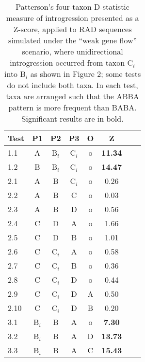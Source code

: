 \documentclass[12pt,letterpaper]{article}
\begin{document}
\begin{table}
  \caption{Patterson's four-taxon D-statistic measure of introgression presented as a Z-score, applied to RAD sequences simulated under the ``weak gene flow'' scenario, where unidirectional introgression occurred from taxon C$_i$ into B$_i$ as shown in Figure 2; some tests do not include both taxa. In each test, taxa are arranged such that the ABBA pattern is more frequent than BABA. Significant results are in bold.}
\label{tab:2}
\begin{center}
\begin{tabular*}{0.5\textwidth}{@{\extracolsep{\fill}}lccccccc}
\hline
Test         & P1    & P2       & P3      & O       &Z    \\
\hline
\hline
1.1          & A    & B$_i$    & C$_i$    & o       &\bf11.34  \\
1.2          & B    & B$_i$    & C$_i$    & o       &\bf14.47  \\
2.1          & A    & B        & C$_i$    & o       &0.26  \\
2.2          & A    & B        & C        & o       &0.03  \\
2.3          & A    & B        & D        & o       &0.56  \\
2.4          & C    & D        & A        & o       &1.66  \\
2.5          & C    & D        & B        & o       &1.01  \\
2.6          & C    & C$_i$    & A        & o       &0.58  \\
2.7          & C    & C$_i$    & B        & o       &0.36  \\
2.8          & C    & C$_i$    & D        & o       &0.44  \\
2.9          & C    & C$_i$    & D        & A       &0.50  \\
2.10         & C    & C$_i$    & D        & B       &0.20  \\
3.1          & B$_i$  & B        & A        & o       &\bf7.30 \\
3.2          & B$_i$  & B        & A        & D       &\bf13.73\\
3.3          & B$_i$  & B        & A        & C       &\bf15.43\\

\end{tabular*}
\end{center}
\end{table}
\end{document}
